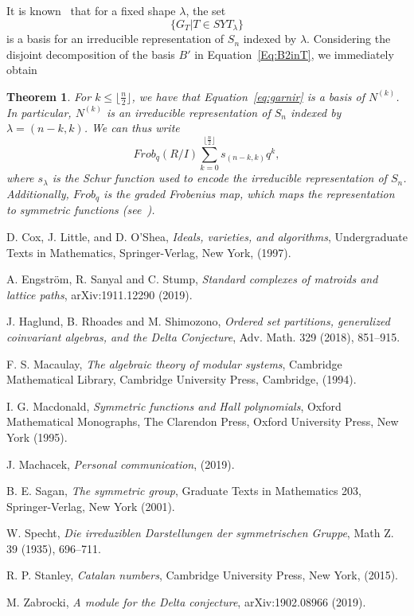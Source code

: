 \documentclass[10pt,a4paper]{article}
\newtheorem{theorem}{Theorem}[section]
\begin{document}
It is known~\cite{Sagan,Specht} that for a fixed shape $\lambda$, the set 
\begin{equation}\label{eq:garnir}
 \big\{G_T\big| T \in SYT_\lambda\big\}
 \end{equation}
  is a basis for an irreducible representation 
of $S_n$ indexed  by   $\lambda$. 
Considering the disjoint decomposition of the basis $B'$ in  Equation~\eqref{Eq:B2inT}, we immediately obtain
\begin{theorem}
    For $k\le \lfloor \frac{n}{2} \rfloor$, we have that Equation~\eqref{eq:garnir} is a basis of $N^{(k)}$. In particular, $N^{(k)}$ is an irreducible representation of $S_n$
    indexed by $\lambda=(n-k,k)$. We can thus write
    $$ Frob_q(R/I) \sum_{k=0}^{ \lfloor \frac{n}{2} \rfloor} s_{(n-k,k)} q^k,$$
    where $s_\lambda$  is the Schur function used to encode the irreducible representation of $S_n$. Additionally, $Frob_q$ is the graded Frobenius map, which maps the representation to symmetric functions (see~\cite{Sagan,Macdonald}).
\end{theorem}

\begin{thebibliography}{20}

D. Cox, J. Little,  and D. O'Shea, 
\emph {Ideals, varieties, and algorithms},
Undergraduate Texts in Mathematics, Springer-Verlag, New York, (1997).

A. Engstr\"om,   R. Sanyal and  C. Stump, 
\emph {Standard complexes of matroids and lattice paths},
arXiv:1911.12290 (2019).

J. Haglund,  B.  Rhoades and  M. Shimozono, 
\emph {Ordered set partitions, generalized coinvariant algebras, and the Delta Conjecture},
Adv. Math. 329 (2018), 851--915.

F. S. Macaulay, 
\emph {The algebraic theory of modular systems},
Cambridge Mathematical Library, Cambridge University Press, Cambridge, (1994).

I. G. Macdonald, 
\emph {Symmetric functions and {H}all polynomials},
Oxford Mathematical Monographs, The Clarendon Press, Oxford University Press, New York (1995).

J. Machacek, 
\emph {Personal communication},
(2019).

B. E. Sagan, 
\emph {The symmetric group},
Graduate Texts in Mathematics 203, Springer-Verlag, New York (2001).

W. Specht, 
\emph {Die irreduziblen Darstellungen der symmetrischen Gruppe},
Math Z. 39 (1935), 696--711.

R. P. Stanley, 
\emph {Catalan numbers},
Cambridge University Press, New York, (2015).

M. Zabrocki, 
\emph {A module for the Delta conjecture},
arXiv:1902.08966 (2019).


\end{thebibliography}
\end{document}
